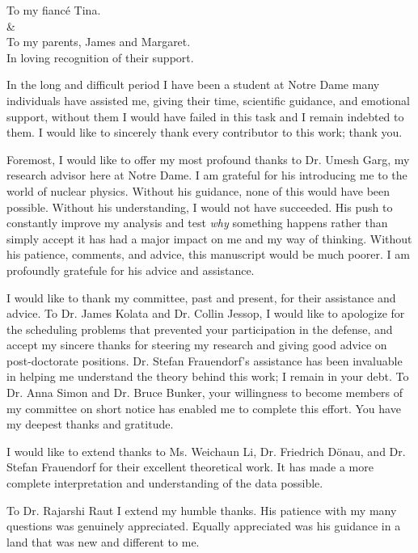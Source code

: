 \documentclass[final,noinfo,numrefs,sort&compress]{nddiss2e}
\begin{document}
\begin{dedication}
	To my fianc\'e Tina.\\\&\\To my parents, James and Margaret.\\
	In loving recognition of their support.
\end{dedication}

\tableofcontents
\listoffigures
\listoftables

\begin{acknowledge}
In the long and difficult period I have been a student at Notre Dame many individuals have assisted me, giving their time, scientific guidance, and emotional support, without them I would have failed in this task and I remain indebted to them. I would like to sincerely thank every contributor to this work; thank you.

Foremost, I would like to offer my most profound thanks to Dr. Umesh Garg, my research advisor here at Notre Dame. I am grateful for his introducing me to the world of nuclear physics. Without his guidance, none of this would have been possible. Without his understanding, I would not have succeeded. His push to constantly improve my analysis and test \emph{why} something happens rather than simply accept it has had a major impact on me and my way of thinking. Without his patience, comments, and advice, this manuscript would be much poorer. I am profoundly gratefule for his advice and assistance.

I would like to thank my committee, past and present, for their assistance and advice. To Dr. James Kolata and Dr. Collin Jessop, I would like to apologize for the scheduling problems that prevented your participation in the defense, and accept my sincere thanks for steering my research and giving good advice on post-doctorate positions. Dr. Stefan Frauendorf's assistance has been invaluable in helping me understand the theory behind this work; I remain in your debt. To Dr. Anna Simon and Dr. Bruce Bunker, your willingness to become members of my committee on short notice has enabled me to complete this effort. You have my deepest thanks and gratitude.

I would like to extend thanks to Ms. Weichaun Li, Dr. Friedrich D\"onau, and Dr. Stefan Frauendorf for their excellent theoretical work. It has made a more complete interpretation and understanding of the data possible.

To Dr. Rajarshi Raut I extend my humble thanks. His patience with my many questions was genuinely appreciated. Equally appreciated was his guidance in a land that was new and different to me.


\end{acknowledge}
\end{document}
